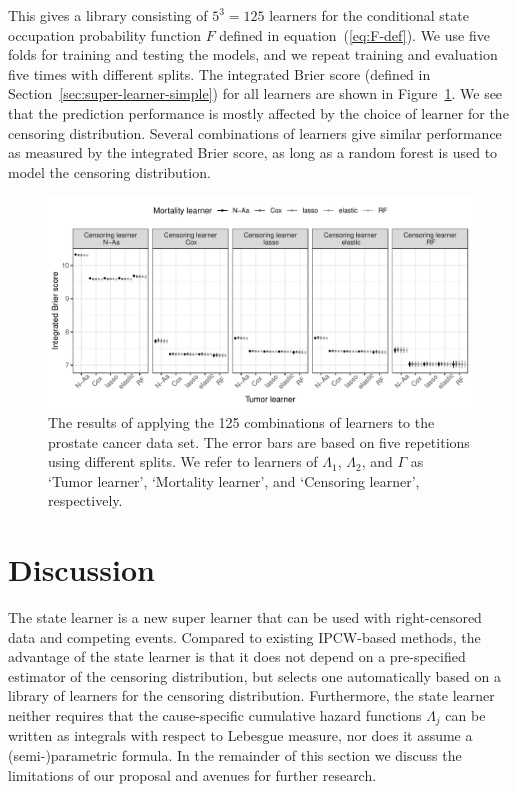 \documentclass[a4paper,danish]{article}
\theoremstyle{plain} %
\numberwithin{theorem}{section}
\theoremstyle{definition} %
\theoremstyle{remark}
\newcommand{\1}{\mathds{1}}
\begin{document}
This gives a library consisting of \( 5^3 = 125 \) learners for the
conditional state occupation probability function \( F \) defined in
equation~(\ref{eq:F-def}). We use five folds for training and testing
the models, and we repeat training and evaluation five times with
different splits.  The integrated Brier score (defined in
Section~\ref{sec:super-learner-simple}) for all learners are shown in
Figure~\ref{fig:zelefski-real}. We see that the prediction
performance is mostly affected by the choice of learner for the
censoring distribution. Several combinations of learners give similar
performance as measured by the integrated Brier score, as long as a
random forest is used to model the censoring distribution.

\begin{figure}
  \centering %
  \includegraphics[width=1\linewidth]{real-data-state-learner.pdf}
  \caption[]{The results of applying the 125 combinations of learners to the
    prostate cancer data set. The error bars are based on five repetitions using
    different splits. We refer to learners of \( \Lambda_1 \), \( \Lambda_2 \),
    and $\Gamma$ as `Tumor learner', `Mortality learner', and `Censoring
    learner', respectively.}
  \label{fig:zelefski-real}
\end{figure}


\section{Discussion}
\label{sec:discussion}

The state learner is a new super learner that can be used with
right-censored data and competing events. Compared to existing
IPCW-based methods, the advantage of the state learner is that it does
not depend on a pre-specified estimator of the censoring distribution,
but selects one automatically based on a library of learners for the
censoring distribution. Furthermore, the state learner neither
requires that the cause-specific cumulative hazard functions
\( \Lambda_j \) can be written as integrals with respect to Lebesgue
measure, nor does it assume a (semi-)parametric formula. In the
remainder of this section we discuss the limitations of our proposal
and avenues for further research.
\end{document}
